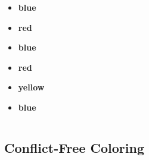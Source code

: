 \documentclass[xcolor=dvipsnames,aspectratio=1610]{beamer}
\begin{document}
\begin{frame}
\begin{columns}
      \begin{column}{0.5\textwidth}
        \begin{multicols}{2}
          \begin{itemize}[leftmargin=1.4cm]
            \item[1:] \textbf{blue}
            \pause
            \item[2:] \textbf{red}
            \pause
            \item[3:] \textbf{blue}
            \pause
            \item[4:] \textbf{red}
            \pause
            \item[5:] \textbf{yellow}
            \pause
            \item[6:] \textbf{blue}
          \end{itemize}
        \end{multicols}
      \end{column}
    \end{columns}

  \end{frame}

  \subsection{Conflict-Free Coloring}
\end{document}
